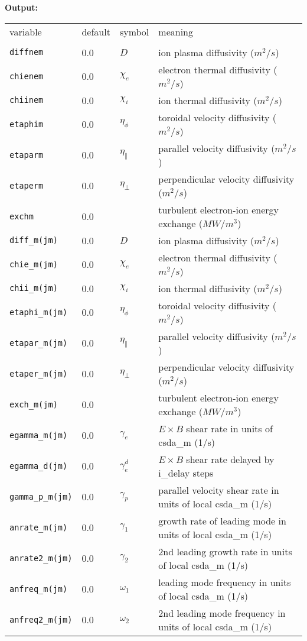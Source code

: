 \noindent
{\bf Output:}
\newline
\begin{center}
\begin{tabular}{lllp{4.5in}}
variable & default & symbol & meaning \\
\\
{\tt diffnem}      & 0.0 & $D$  & ion plasma diffusivity ($m^2/s$) \\
{\tt chienem}      & 0.0 & $\chi_e$ & electron thermal diffusivity ($m^2/s$) \\
{\tt chiinem}      & 0.0 & $\chi_i$ & ion thermal diffusivity ($m^2/s$) \\
{\tt etaphim}      & 0.0 & $\eta_{\phi}$ & toroidal velocity diffusivity ($m^2/s$) \\
{\tt etaparm}      & 0.0 & $\eta_{\parallel}$ & parallel velocity diffusivity ($m^2/s$) \\
{\tt etaperm}      & 0.0 & $\eta_{\perp}$ & perpendicular velocity diffusivity ($m^2/s$) \\
{\tt exchm}        & 0.0 &  & turbulent electron-ion energy exchange ($MW/m^3$) \\
{\tt diff\_m(jm)}    & 0.0 & $D$ & ion plasma diffusivity ($m^2/s$) \\
{\tt chie\_m(jm)}    & 0.0 & $\chi_e$ & electron thermal diffusivity ($m^2/s$) \\
{\tt chii\_m(jm)}    & 0.0 & $\chi_i$ & ion thermal diffusivity ($m^2/s$) \\
{\tt etaphi\_m(jm)}  & 0.0 & $\eta_{\phi}$ & toroidal velocity diffusivity ($m^2/s$) \\
{\tt etapar\_m(jm)}  & 0.0 & $\eta_{\parallel}$ & parallel velocity diffusivity ($m^2/s$) \\
{\tt etaper\_m(jm)}  & 0.0 & $\eta_{\perp}$ & perpendicular velocity diffusivity ($m^2/s$) \\
{\tt exch\_m(jm)}    & 0.0 &  & turbulent electron-ion energy exchange ($MW/m^3$) \\
{\tt egamma\_m(jm)}  & 0.0 & $\gamma_e$ & $E\times B$ shear rate in units of csda\_m (1/s)  \\
{\tt egamma\_d(jm)}  & 0.0 & $\gamma_e^d$ & $E\times B$ shear rate delayed by i\_delay steps\\
{\tt gamma\_p\_m(jm)}& 0.0 & $\gamma_p$ & parallel velocity shear rate in units of local csda\_m (1/s)\\
{\tt anrate\_m(jm)}  & 0.0 & $\gamma_1$ & growth rate of leading mode in units of local csda\_m (1/s)\\
{\tt anrate2\_m(jm)} & 0.0 & $\gamma_2$ & 2nd leading growth rate in units of local csda\_m (1/s)\\
{\tt anfreq\_m(jm)}  & 0.0 & $\omega_1$ & leading mode frequency in units of local csda\_m (1/s)\\
{\tt anfreq2\_m(jm)} & 0.0 & $\omega_2$ & 2nd leading mode frequency in units of local csda\_m (1/s)\\
\end{tabular}
\end{center}

